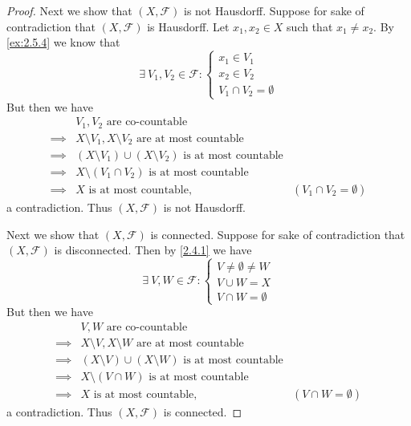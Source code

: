\begin{proof}
  Next we show that \((X, \mathcal{F})\) is not Hausdorff.
  Suppose for sake of contradiction that \((X, \mathcal{F})\) is Hausdorff.
  Let \(x_1, x_2 \in X\) such that \(x_1 \neq x_2\).
  By \cref{ex:2.5.4} we know that
  \[
    \exists\ V_1, V_2 \in \mathcal{F} : \begin{cases}
      x_1 \in V_1 \\
      x_2 \in V_2 \\
      V_1 \cap V_2 = \emptyset
    \end{cases}
  \]
  But then we have
  \begin{align*}
             & V_1, V_2 \text{ are co-countable}                                                                  \\
    \implies & X \setminus V_1, X \setminus V_2 \text{ are at most countable}                                     \\
    \implies & (X \setminus V_1) \cup (X \setminus V_2) \text{ is at most countable}                              \\
    \implies & X \setminus (V_1 \cap V_2) \text{ is at most countable}                                            \\
    \implies & X \text{ is at most countable},                                       & (V_1 \cap V_2 = \emptyset)
  \end{align*}
  a contradiction.
  Thus \((X, \mathcal{F})\) is not Hausdorff.

  Next we show that \((X, \mathcal{F})\) is connected.
  Suppose for sake of contradiction that \((X, \mathcal{F})\) is disconnected.
  Then by \cref{2.4.1} we have
  \[
    \exists\ V, W \in \mathcal{F} : \begin{cases}
      V \neq \emptyset \neq W \\
      V \cup W = X            \\
      V \cap W = \emptyset
    \end{cases}
  \]
  But then we have
  \begin{align*}
             & V, W \text{ are co-countable}                                                              \\
    \implies & X \setminus V, X \setminus W \text{ are at most countable}                                 \\
    \implies & (X \setminus V) \cup (X \setminus W) \text{ is at most countable}                          \\
    \implies & X \setminus (V \cap W) \text{ is at most countable}                                        \\
    \implies & X \text{ is at most countable},                                   & (V \cap W = \emptyset)
  \end{align*}
  a contradiction.
  Thus \((X, \mathcal{F})\) is connected.


\end{proof}
